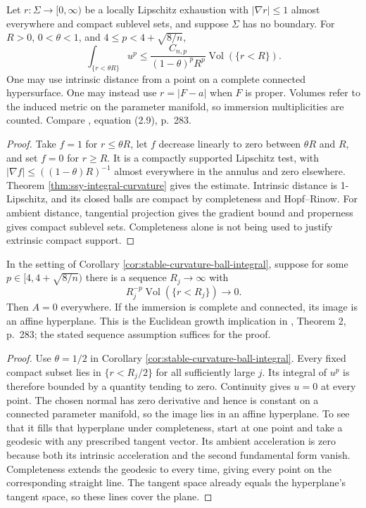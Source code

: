 \begin{corollary}\label{cor:stable-curvature-ball-integral}
Let $r:\Sigma\to[0,\infty)$ be a locally Lipschitz exhaustion with $|\nabla r|\leq1$ almost everywhere and compact sublevel sets, and suppose $\Sigma$ has no boundary. For $R>0$, $0<\theta<1$, and $4\leq p<4+\sqrt{8/n}$,
\[
 \int_{\{r<\theta R\}}u^p
 \leq\frac{C_{n,p}}{(1-\theta)^pR^p}\operatorname{Vol}(\{r<R\}).
\]
One may use intrinsic distance from a point on a complete connected hypersurface. One may instead use $r=|F-a|$ when $F$ is proper. Volumes refer to the induced metric on the parameter manifold, so immersion multiplicities are counted. Compare \cite{SSY75}, equation (2.9), p.~283.
\end{corollary}
\begin{proof}
Take $f=1$ for $r\leq\theta R$, let $f$ decrease linearly to zero between $\theta R$ and $R$, and set $f=0$ for $r\geq R$. It is a compactly supported Lipschitz test, with $|\nabla f|\leq((1-\theta)R)^{-1}$ almost everywhere in the annulus and zero elsewhere. Theorem \ref{thm:ssy-integral-curvature} gives the estimate. Intrinsic distance is 1-Lipschitz, and its closed balls are compact by completeness and Hopf--Rinow. For ambient distance, tangential projection gives the gradient bound and properness gives compact sublevel sets. Completeness alone is not being used to justify extrinsic compact support.
\end{proof}

\begin{theorem}\label{thm:stable-subcritical-growth}
In the setting of Corollary \ref{cor:stable-curvature-ball-integral}, suppose for some $p\in[4,4+\sqrt{8/n})$ there is a sequence $R_j\to\infty$ with
\[
 R_j^{-p}\operatorname{Vol}(\{r<R_j\})\longrightarrow0.
\]
Then $A=0$ everywhere. If the immersion is complete and connected, its image is an affine hyperplane. This is the Euclidean growth implication in \cite{SSY75}, Theorem 2, p.~283; the stated sequence assumption suffices for the proof.
\end{theorem}
\begin{proof}
Use $\theta=1/2$ in Corollary \ref{cor:stable-curvature-ball-integral}. Every fixed compact subset lies in $\{r<R_j/2\}$ for all sufficiently large $j$. Its integral of $u^p$ is therefore bounded by a quantity tending to zero. Continuity gives $u=0$ at every point. The chosen normal has zero derivative and hence is constant on a connected parameter manifold, so the image lies in an affine hyperplane. To see that it fills that hyperplane under completeness, start at one point and take a geodesic with any prescribed tangent vector. Its ambient acceleration is zero because both its intrinsic acceleration and the second fundamental form vanish. Completeness extends the geodesic to every time, giving every point on the corresponding straight line. The tangent space already equals the hyperplane's tangent space, so these lines cover the plane.
\end{proof}

